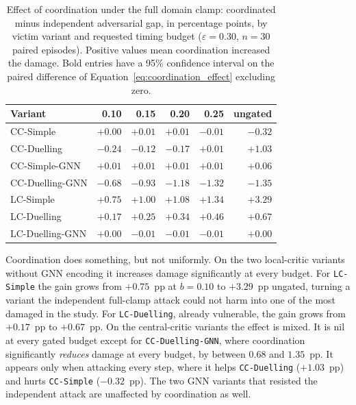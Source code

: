\begin{table}[htbp]
  \centering
  \caption{Effect of coordination under the full domain clamp: coordinated minus
           independent adversarial gap, in percentage points, by victim variant and
           requested timing budget ($\varepsilon = 0.30$, $n = 30$ paired episodes).
           Positive values mean coordination increased the damage. Bold entries
           have a 95\% confidence interval on the paired difference of
           Equation~\eqref{eq:coordination_effect} excluding zero.}
  \label{tab:coordination_effect}
  \begin{tabular}{lrrrrr}
    \hline
    \textbf{Variant} & \textbf{0.10} & \textbf{0.15} & \textbf{0.20} & \textbf{0.25} & \textbf{ungated} \\
    \hline
    CC-Simple        & $+0.00$ & $+0.01$ & $+0.01$ & $-0.01$ & $\mathbf{-0.32}$ \\
    CC-Duelling      & $-0.24$ & $-0.12$ & $-0.17$ & $+0.01$ & $\mathbf{+1.03}$ \\
    CC-Simple-GNN    & $+0.01$ & $+0.01$ & $+0.01$ & $+0.01$ & $+0.06$ \\
    CC-Duelling-GNN  & $\mathbf{-0.68}$ & $\mathbf{-0.93}$ & $\mathbf{-1.18}$ & $\mathbf{-1.32}$ & $\mathbf{-1.35}$ \\
    LC-Simple        & $\mathbf{+0.75}$ & $\mathbf{+1.00}$ & $\mathbf{+1.08}$ & $\mathbf{+1.34}$ & $\mathbf{+3.29}$ \\
    LC-Duelling      & $\mathbf{+0.17}$ & $\mathbf{+0.25}$ & $\mathbf{+0.34}$ & $\mathbf{+0.46}$ & $\mathbf{+0.67}$ \\
    LC-Duelling-GNN  & $+0.00$ & $-0.01$ & $-0.01$ & $-0.01$ & $+0.00$ \\
    \hline
  \end{tabular}
\end{table}

Coordination does something, but not uniformly. On the two local-critic variants
without GNN encoding it increases damage significantly at every budget.
For \texttt{LC-Simple} the gain grows from $+0.75$~pp at $b = 0.10$ to $+3.29$~pp
ungated, turning a variant the independent full-clamp attack could not harm into one of
the most
damaged in the study. For \texttt{LC-Duelling}, already vulnerable, the gain grows from
$+0.17$~pp to $+0.67$~pp. On the central-critic variants the effect is mixed. It is nil
at every gated budget except for \texttt{CC-Duelling-GNN}, where coordination
significantly \emph{reduces} damage at every budget, by between $0.68$ and $1.35$~pp.
It appears only when attacking every step, where it helps \texttt{CC-Duelling}
($+1.03$~pp) and hurts \texttt{CC-Simple} ($-0.32$~pp). The two GNN variants that
resisted the independent attack are unaffected by coordination as well.

